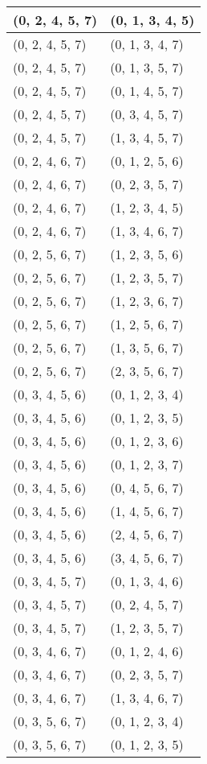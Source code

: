 \begin{footnotesize}
\begin{longtable}[c]{|l|l|}
(0, 2, 4, 5, 7)
&(0, 1, 3, 4, 5)
\\ \hline
(0, 2, 4, 5, 7)
&(0, 1, 3, 4, 7)
\\ \hline
(0, 2, 4, 5, 7)
&(0, 1, 3, 5, 7)
\\ \hline
(0, 2, 4, 5, 7)
&(0, 1, 4, 5, 7)
\\ \hline
(0, 2, 4, 5, 7)
&(0, 3, 4, 5, 7)
\\ \hline
(0, 2, 4, 5, 7)
&(1, 3, 4, 5, 7)
\\ \hline
(0, 2, 4, 6, 7)
&(0, 1, 2, 5, 6)
\\ \hline
(0, 2, 4, 6, 7)
&(0, 2, 3, 5, 7)
\\ \hline
(0, 2, 4, 6, 7)
&(1, 2, 3, 4, 5)
\\ \hline
(0, 2, 4, 6, 7)
&(1, 3, 4, 6, 7)
\\ \hline
(0, 2, 5, 6, 7)
&(1, 2, 3, 5, 6)
\\ \hline
(0, 2, 5, 6, 7)
&(1, 2, 3, 5, 7)
\\ \hline
(0, 2, 5, 6, 7)
&(1, 2, 3, 6, 7)
\\ \hline
(0, 2, 5, 6, 7)
&(1, 2, 5, 6, 7)
\\ \hline
(0, 2, 5, 6, 7)
&(1, 3, 5, 6, 7)
\\ \hline
(0, 2, 5, 6, 7)
&(2, 3, 5, 6, 7)
\\ \hline
(0, 3, 4, 5, 6)
&(0, 1, 2, 3, 4)
\\ \hline
(0, 3, 4, 5, 6)
&(0, 1, 2, 3, 5)
\\ \hline
(0, 3, 4, 5, 6)
&(0, 1, 2, 3, 6)
\\ \hline
(0, 3, 4, 5, 6)
&(0, 1, 2, 3, 7)
\\ \hline
(0, 3, 4, 5, 6)
&(0, 4, 5, 6, 7)
\\ \hline
(0, 3, 4, 5, 6)
&(1, 4, 5, 6, 7)
\\ \hline
(0, 3, 4, 5, 6)
&(2, 4, 5, 6, 7)
\\ \hline
(0, 3, 4, 5, 6)
&(3, 4, 5, 6, 7)
\\ \hline
(0, 3, 4, 5, 7)
&(0, 1, 3, 4, 6)
\\ \hline
(0, 3, 4, 5, 7)
&(0, 2, 4, 5, 7)
\\ \hline
(0, 3, 4, 5, 7)
&(1, 2, 3, 5, 7)
\\ \hline
(0, 3, 4, 6, 7)
&(0, 1, 2, 4, 6)
\\ \hline
(0, 3, 4, 6, 7)
&(0, 2, 3, 5, 7)
\\ \hline
(0, 3, 4, 6, 7)
&(1, 3, 4, 6, 7)
\\ \hline
(0, 3, 5, 6, 7)
&(0, 1, 2, 3, 4)
\\ \hline
(0, 3, 5, 6, 7)
&(0, 1, 2, 3, 5)

\end{longtable}
\end{footnotesize}
